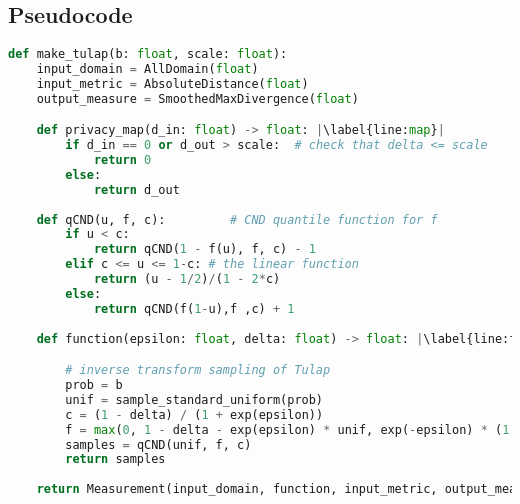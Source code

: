\documentclass{article}
\begin{document}
\subsection*{Pseudocode}


            




\begin{lstlisting}[language=Python, escapechar=|]
def make_tulap(b: float, scale: float):
    input_domain = AllDomain(float)
    input_metric = AbsoluteDistance(float)
    output_measure = SmoothedMaxDivergence(float)

    def privacy_map(d_in: float) -> float: |\label{line:map}|
        if d_in == 0 or d_out > scale:  # check that delta <= scale
            return 0
        else: 
            return d_out
            
    def qCND(u, f, c):         # CND quantile function for f
        if u < c:
            return qCND(1 - f(u), f, c) - 1
        elif c <= u <= 1-c: # the linear function 
            return (u - 1/2)/(1 - 2*c)
        else:
            return qCND(f(1-u),f ,c) + 1  
            
    def function(epsilon: float, delta: float) -> float: |\label{line:fn}|

        # inverse transform sampling of Tulap
        prob = b
        unif = sample_standard_uniform(prob)
        c = (1 - delta) / (1 + exp(epsilon))
        f = max(0, 1 - delta - exp(epsilon) * unif, exp(-epsilon) * (1 - delta - unif))
        samples = qCND(unif, f, c)
        return samples
        
    return Measurement(input_domain, function, input_metric, output_measure, privacy_map)
\end{lstlisting}
\end{document}
